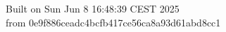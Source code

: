 {\noindent Built on Sun Jun  8 16:48:39 CEST 2025} \\ 
 {\noindent from 0e9f886ceadc4bcfb417ce56ca8a93d61abd8cc1}
